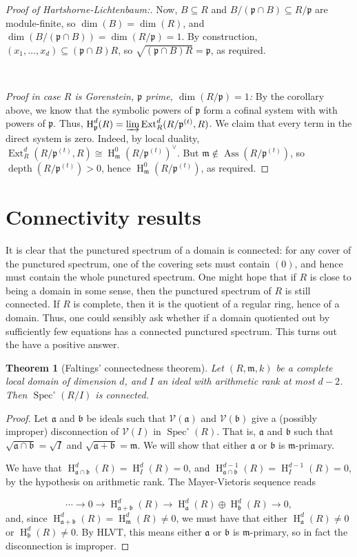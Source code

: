 \documentclass[11pt]{book}
\newtheorem{theorem}{Theorem}[chapter]
\numberwithin{equation}{section}
\numberwithin{theorem}{chapter}
\theoremstyle{definition}
\newtheorem*{basic properties}{Basic Properties}
\newtheorem*{Important Remark}{Important Remark}
\theoremstyle{remark}
\newcommand{\m}{\mathfrak{m}}
\newcommand{\V}{\mathcal{V}}
\newcommand{\p}{\mathfrak{p}}
\renewcommand{\aa}{\mathfrak{a}}
\newcommand{\bb}{\mathfrak{b}}
\newcommand{\Spec}{\operatorname{Spec}}
\newcommand{\Ext}{\operatorname{Ext}}
\newcommand{\Ass}{\operatorname{Ass}}
\renewcommand{\dim}{\operatorname{dim}}
\newcommand{\depth}{\operatorname{depth}}
\renewcommand{\H}{\operatorname{H}}
\begin{document}
\begin{proof}[Proof of Hartshorne-Lichtenbaum:]
	Now, $B\subseteq R$ and $B/ (\p \cap B) \subseteq R/\p$ are module-finite, so $\dim(B)=\dim(R)$, and $\dim(B/ (\p \cap B))=\dim(R/\p)=1$. By construction, $(x_1,\dots,x_d)\subseteq (\p \cap B)R$, so $\sqrt{(\p \cap B)R}=\p$, as required.
	
	
		\
	
	{\it Proof in case $R$ is Gorenstein, $\p$ prime, $\dim(R/\p)=1$:}
	By the corollary above, we know that the symbolic powers of $\p$ form a cofinal system with with powers of $\p$. Thus, $\H^d_{\p}(R)=\varinjlim \Ext^{d}_R(R/\p^{(t)},R)$. We claim that every term in the direct system is zero. Indeed, by local duality, $\Ext^{d}_R(R/\p^{(t)},R)\cong \H^0_{\m}(R/\p^{(t)})^{\vee}$. But $\m\notin\Ass(R/\p^{(t)})$, so $\depth(R/\p^{(t)})>0$, hence $\H^0_{\m}(R/\p^{(t)})$, as required.
	\end{proof}




\section{Connectivity results}

It is clear that the punctured spectrum of a domain is connected: for any cover of the punctured spectrum, one of the covering sets must contain $(0)$, and hence must contain the whole punctured spectrum. One might hope that if $R$ is close to being a domain in some sense, then the punctured spectrum of $R$ is still connected. If $R$ is complete, then it is the quotient of a regular ring, hence of a domain. Thus, one could sensibly ask whether if a domain quotiented out by sufficiently few equations has a connected punctured spectrum. This turns out the have a positive answer.

\begin{theorem}[Faltings' connectedness theorem]
	Let $(R,\m,k)$ be a complete local domain of dimension $d$, and $I$ an ideal with arithmetic rank at most $d-2$. Then $\Spec^{\circ}(R/I)$ is connected.
\end{theorem}
\begin{proof}
	Let  $\aa$ and $\bb$ be ideals such that $\V(\aa)$ and $\V(\bb)$ give a (possibly improper) disconnection of $\V(I)$ in $\Spec^{\circ}(R)$. That is, $\aa$ and $\bb$ such that $\sqrt{\aa \cap \bb}=\sqrt{I}$ and $\sqrt{\aa + \bb}=\m$. We will show that either $\aa$ or $\bb$ is $\m$-primary.
	
	We have that $\H^d_{\aa \cap \bb}(R)=\H^d_{I}(R)=0$, and $\H^{d-1}_{\aa \cap \bb}(R)=\H^{d-1}_{I}(R)=0$, by the hypothesis on arithmetic rank. The Mayer-Vietoris sequence reads
	
	\[ \cdots \to 0 \to \H^{d}_{\aa + \bb}(R) \to \H^d_{\aa}(R) \oplus \H^d_{\bb}(R) \to 0, \]
	and, since $\H^{d}_{\aa + \bb}(R)= \H^d_{\m}(R)\neq 0$, we must have that either $\H^d_{\aa}(R)\neq 0$ or $\H^d_{\bb}(R)\neq 0$. By HLVT, this means either $\aa$ or $\bb$ is $\m$-primary, so in fact the disconnection is improper.
\end{proof}
\end{document}
